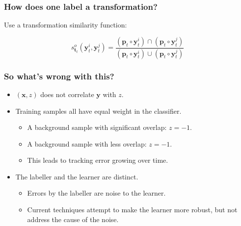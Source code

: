 \begin{frame}
    \frametitle{How does one label a transformation?}
    Use a transformation similarity function:

    \begin{equation}
        s_{\mathbf{t}_t}^o \left( \mathbf{y}_t^i, \mathbf{y}_t^j \right) =
            \frac{\left( \mathbf{p}_t \circ \mathbf{y}_t^i \right) \cap \left( \mathbf{p}_t \circ \mathbf{y}_t^j \right)}
                 {\left( \mathbf{p}_t \circ \mathbf{y}_t^i \right) \cup \left( \mathbf{p}_t \circ \mathbf{y}_t^j \right)}
    \end{equation}


\end{frame}

\begin{frame}
    \frametitle{So what's wrong with this?}

    \begin{itemize}
        \item \((\mathbf{x}, z)\) does not correlate \(\mathbf{y}\) with \(z\).
        \item Training samples all have equal weight in the classifier.
            \begin{itemize}
                \item A background sample with significant overlap: \(z = -1\).
                \item A background sample with less overlap: \(z = -1\).
                \item This leads to tracking error growing over time.
            \end{itemize}
        \item The labeller and the learner are distinct.
            \begin{itemize}
                \item Errors by the labeller are noise to the learner.
                \item Current techniques attempt to make the learner more
                    robust, but not address the cause of the noise.
            \end{itemize}
    \end{itemize}
\end{frame}
